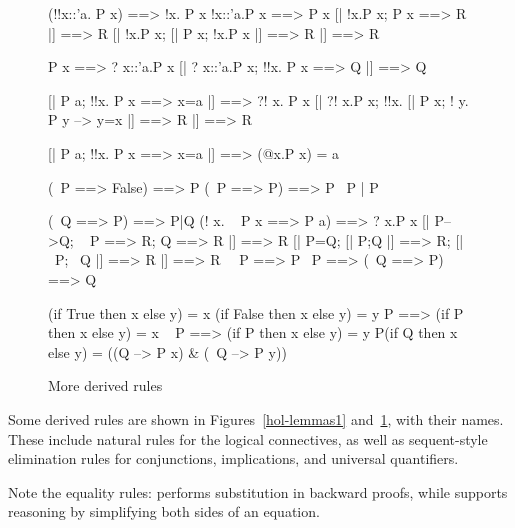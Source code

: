 \begin{figure}
\begin{ttbox}\makeatother
{}      (!!x::'a. P x) ==> !x. P x
      !x::'a.P x ==> P x
      [| !x.P x;  P x ==> R |] ==> R
  [| !x.P x;  [| P x; !x.P x |] ==> R |] ==> R

       P x ==> ? x::'a.P x
       [| ? x::'a.P x; !!x. P x ==> Q |] ==> Q

      [| P a;  !!x. P x ==> x=a |] ==> ?! x. P x
      [| ?! x.P x;  !!x. [| P x;  ! y. P y --> y=x |] ==> R 
          |] ==> R

 [| P a;  !!x. P x ==> x=a |] ==> (@x.P x) = a

          (~P ==> False) ==> P
       (~P ==> P) ==> P
 ~P | P

          (~Q ==> P) ==> P|Q
            (! x. ~ P x ==> P a) ==> ? x.P x
           [| P-->Q; ~ P ==> R; Q ==> R |] ==> R
           [| P=Q;  [| P;Q |] ==> R;  [| ~P; ~Q |] ==> R |] ==> R
         ~~P ==> P
            ~P ==> (~Q ==> P) ==> Q

         (if True then x else y) = x
        (if False then x else y) = y
            P ==> (if P then x else y) = x
        ~ P ==> (if P then x else y) = y
       P(if Q then x else y) = ((Q --> P x) & (~Q --> P y))
\end{ttbox}
\caption{More derived rules} \label{hol-lemmas2}
\end{figure}


Some derived rules are shown in Figures~\ref{hol-lemmas1}
and~\ref{hol-lemmas2}, with their {\ML} names.  These include natural rules
for the logical connectives, as well as sequent-style elimination rules for
conjunctions, implications, and universal quantifiers.  

Note the equality rules:  performs substitution in
backward proofs, while  supports reasoning by
simplifying both sides of an equation.


